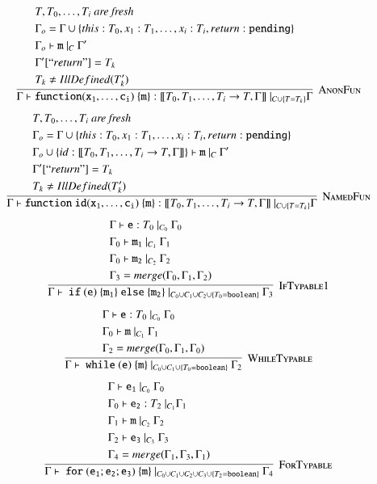 \documentclass[12pt,a4paper,twoside,openright]{report}
\theoremstyle{definition}
\theoremstyle{dotless}
\begin{document}
$$\infer[\textsc{AnonFun}]{
  \Gamma\vdash\mathtt{function(x_1, \dots, c_i)\ \{m\}}:[\![T_0, T_1, \dots, T_i\rightarrow T, \Gamma]\!]\ |_{C\cup \{T=T_k\}} \Gamma
}{
  \begin{split}
	&T, T_0, \dots, T_i\textit{ are fresh} \\
  	&\Gamma_o = \Gamma\cup\{this:T_0, x_1:T_1, \dots, x_i:T_i, return: \mathtt{pending}\} \\ 
  	&\Gamma_o \vdash \mathtt{m}\ |_C\ \Gamma'\\
  	&\Gamma'[``return"] = T_k \\
	&T_k \neq IllDefined(T_k')
  \end{split}
}$$
$$\infer[\textsc{NamedFun}]{
  \Gamma\vdash\mathtt{function\ id(x_1, \dots, c_i)\ \{m\}}:[\![T_0, T_1, \dots, T_i\rightarrow T, \Gamma]\!]\ |_{C\cup \{T=T_k\}} \Gamma
}{
  \begin{split}
	&T, T_0, \dots, T_i\textit{ are fresh} \\
  	&\Gamma_o = \Gamma\cup\{this:T_0, x_1:T_1, \dots, x_i:T_i, return: \mathtt{pending}\} \\ 
	& \Gamma_o\cup \{ id: [\![T_0, T_1, \dots, T_i\rightarrow T, \Gamma]\!]\} \vdash \mathtt{m}\ |_C\ \Gamma'\\
  	&\Gamma'[``return"] = T_k \\
	&T_k \neq IllDefined(T_k')
  \end{split}
}$$
$$\infer[\textsc{IfTypable1}]{
  \Gamma\vdash\ \mathtt{if\ (e)\ \{m_1\}\ else\ \{m_2\}}\ |_{C_0\cup C_1\cup C_2\cup\{T_0=\mathtt{boolean}\}}\ \Gamma_3
}{
  \begin{split}
	&\Gamma\vdash \mathtt{e}:T_0\ |_{C_0}\ \Gamma_0 \\
	&\Gamma_0\vdash \mathtt{m_1}\ |_{C_1}\ \Gamma_1 \\
	&\Gamma_0\vdash \mathtt{m_2}\ |_{C_2}\ \Gamma_2 \\
	&\Gamma_3 = merge(\Gamma_0, \Gamma_1, \Gamma_2)
  \end{split}
}$$
$$\infer[\textsc{WhileTypable}]{
  \Gamma\vdash\ \mathtt{while\ (e)\ \{m\}}\ |_{C_0\cup C_1\cup \{T_0=\mathtt{boolean}\}}\ \Gamma_2
}{
  \begin{split}
	&\Gamma\vdash \mathtt{e}:T_0\ |_{C_0}\ \Gamma_0 \\
	&\Gamma_0\vdash \mathtt{m}\ |_{C_1}\ \Gamma_1 \\
	&\Gamma_2 = merge(\Gamma_0, \Gamma_1, \Gamma_0)
  \end{split}
}$$
$$\infer[\textsc{ForTypable}]{
  \Gamma\vdash\ \mathtt{for\ (e_1; e_2; e_3)\ \{m\}}\ |_{C_0\cup C_1\cup C_2\cup C_3\cup \{T_2=\mathtt{boolean}\}}\ \Gamma_4
}{
  \begin{split}
	&\Gamma\vdash \mathtt{e_1}\ |_{C_0}\ \Gamma_0 \\
	&\Gamma_0\vdash \mathtt{e_2} : T_2\ |_{C_1} \Gamma_1 \\
	&\Gamma_1\vdash \mathtt{m}\ |_{C_2}\ \Gamma_2 \\
	&\Gamma_2\vdash \mathtt{e_3}\ |_{C_3}\ \Gamma_3 \\
	&\Gamma_4 = merge(\Gamma_1, \Gamma_3, \Gamma_1)
  \end{split}
}$$
\end{document}
